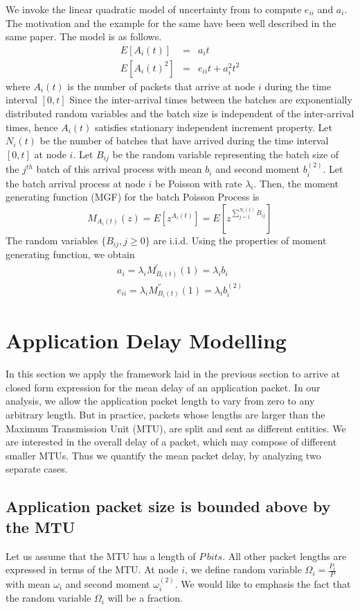\documentclass[10pt, conference, compsocconf]{IEEEtran}
\begin{document}
We invoke the linear quadratic model of uncertainty from \cite{lee} to compute $e_{ii}$ and $a_i$. The motivation and the example for the same have been well described in the same paper. The model is as follows.
\begin{eqnarray} 
E[A_i(t)]  &=& a_i t \label{eq:lum1} \\
E[A_i(t)^2]  &=& e_{ii}t + a^2_it^2 \label{eq:lum2} 
\end{eqnarray}
where $A_i(t)$ is the number of packets that arrive at node $i$ during the time interval $[0,t]$ Since the inter-arrival times between the batches are exponentially distributed random variables and the batch size is independent of the inter-arrival times, hence $A_i(t)$ satisfies stationary independent increment property. Let $N_{i}(t)$ be the number of batches that have arrived during the time interval $[0, t]$ at node $i$. Let $B_{ij}$ be the random variable representing the batch size of the $j^{th}$ batch of this arrival process with mean $b_i$ and second moment $b^{(2)}_i$. Let the batch arrival process at node $i$ be Poisson with rate $\lambda_i$. Then, the moment generating function (MGF) for the batch Poisson Process is
$$M_{A_i(t)}(z) = E[z^{A_i(t)}] =  E[z^{\sum^{N_i(t)}_{j=1} B_{ij}}]$$
The random variables $\{B_{ij} , j \geq 0\}$ are i.i.d. Using the properties of moment generating function, we obtain
\begin{eqnarray}
a_i = \lambda_i M^{'}_{B_i(t)}(1)=\lambda_i b_i \\ \label{eq:ai}
e_{ii} = \lambda_i M^{''}_{B_i(t)}(1)=\lambda_i b^{(2)}_i \label{eq:eii} 
\end{eqnarray}

\section{\large{Application Delay Modelling}}
\label{analysis}
In this section we apply the framework laid in the previous section to arrive at closed form expression for the mean delay of an application packet. In our analysis, we allow the application packet length to vary from zero to any arbitrary length. But in practice, packets whose lengths are larger than the Maximum Transmission Unit (MTU), are split and sent as different entities. We are interested in the overall delay of a packet, which may compose of different smaller MTUs. Thus we quantify the mean packet delay, by analyzing two separate cases.

\subsection{Application packet size is bounded above by the MTU}
Let us assume that the MTU has a length of $P\, bits$. All other packet lengths are expressed in terms of the MTU. At node $i$, we define random variable $\Omega_i=\frac{P_i}{P}$ with mean $\omega_i$ and second moment $\omega^{(2)}_i$. We would like to emphasis the fact that the random variable $\Omega_i$ will be a fraction. 
\end{document}
